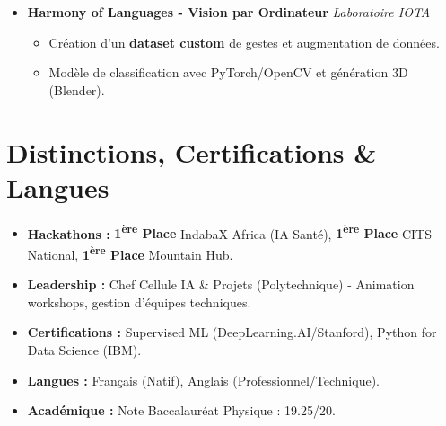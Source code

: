 \documentclass[a4paper,11pt]{article}
\begin{document}
\begin{itemize}[leftmargin=*, label={}]
\item \textbf{Harmony of Languages - Vision par Ordinateur} \hfill \textit{Laboratoire IOTA}
\vspace{-2pt}
    \begin{itemize}[leftmargin=0.4cm, nosep, label=\tiny$\bullet$]
        \item \small{Création d'un \textbf{dataset custom} de gestes et augmentation de données.}
        \item \small{Modèle de classification avec PyTorch/OpenCV et génération 3D (Blender).}
    \end{itemize}

\end{itemize}

\section{Distinctions, Certifications \& Langues}
\begin{itemize}[leftmargin=*, nosep]
    \item \textbf{Hackathons :} \textbf{1\textsuperscript{ère} Place} IndabaX Africa (IA Santé), \textbf{1\textsuperscript{ère} Place} CITS National, \textbf{1\textsuperscript{ère} Place} Mountain Hub.
    \item \textbf{Leadership :} Chef Cellule IA \& Projets (Polytechnique) - Animation workshops, gestion d'équipes techniques.
    \item \textbf{Certifications :} Supervised ML (DeepLearning.AI/Stanford), Python for Data Science (IBM).
    \item \textbf{Langues :} Français (Natif), Anglais (Professionnel/Technique).
    \item \textbf{Académique :} Note Baccalauréat Physique : 19.25/20.
\end{itemize}
\end{document}
